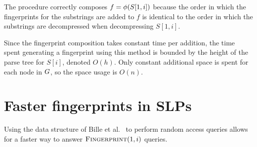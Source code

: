 


The procedure correctly composes $f = \phi(S[1, i])$ because the order in which the fingerprints for the substrings are added to $f$ is identical to the order in which the substrings are decompressed when decompressing $S[1, i]$. 

Since the fingerprint composition takes constant time per addition, the time spent generating a fingerprint using this method is bounded by the height of the parse tree for $S[i]$, denoted $O(h)$. Only constant additional space is spent for each node in $G$, so the space usage is $O(n)$.

\section{Faster fingerprints in SLPs}
Using the data structure of Bille et al.~\cite{bille2011random} to perform random access queries allows for a faster way to answer $\textsc{Fingerprint}(1, i)$ queries.

